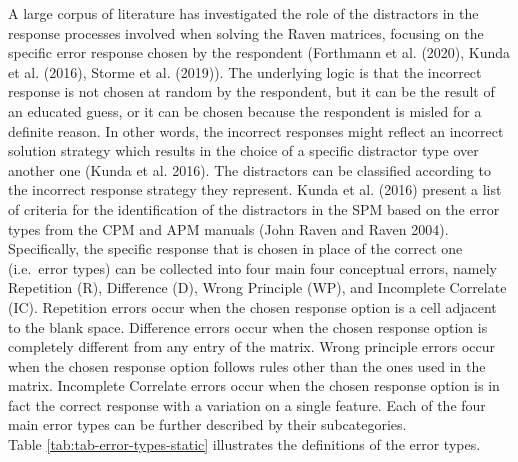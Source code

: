 A large corpus of literature has investigated the role of the distractors in the response processes involved when solving the Raven matrices, focusing on the specific error response chosen by the respondent (Forthmann et al. (2020), Kunda et al. (2016), Storme et al. (2019)).
The underlying logic is that the incorrect response is not chosen at random by the respondent, but it can be the result of an educated guess, or it can be chosen because the respondent is misled for a definite reason.
In other words, the incorrect responses might reflect an incorrect solution strategy which results in the choice of a specific distractor type over another one (Kunda et al. 2016). The distractors can be classified according to the incorrect response strategy they represent.
Kunda et al. (2016) present a list of criteria for the identification of the distractors in the SPM based on the error types from the CPM and APM manuals (John Raven and Raven 2004). Specifically, the specific response that is chosen in place of the correct one (i.e.~error types) can be collected into four main four conceptual errors, namely Repetition (R), Difference (D), Wrong Principle (WP), and Incomplete Correlate (IC).
Repetition errors occur when the chosen response option is a cell adjacent to the blank space.
Difference errors occur when the chosen response option is completely different from any entry of the matrix.
Wrong principle errors occur when the chosen response option follows rules other than the ones used in the matrix. Incomplete Correlate errors occur when the chosen response option is in fact the correct response with a variation on a single feature. Each of the four main error types can be further described by their subcategories.\\
Table \ref{tab:tab-error-types-static} illustrates the definitions of the error types.

